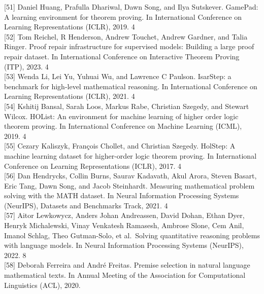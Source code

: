 \documentclass[
]{article}
\begin{document}
{[}51{]} Daniel Huang, Prafulla Dhariwal, Dawn Song, and Ilya Sutskever.
GamePad: A learning environment for theorem proving. In International
Conference on Learning Representations (ICLR), 2019. 4\\
{[}52{]} Tom Reichel, R Henderson, Andrew Touchet, Andrew Gardner, and
Talia Ringer. Proof repair infrastructure for supervised models:
Building a large proof repair dataset. In International Conference on
Interactive Theorem Proving (ITP), 2023. 4\\
{[}53{]} Wenda Li, Lei Yu, Yuhuai Wu, and Lawrence C Paulson. IsarStep:
a benchmark for high-level mathematical reasoning. In International
Conference on Learning Representations (ICLR), 2021. 4\\
{[}54{]} Kshitij Bansal, Sarah Loos, Markus Rabe, Christian Szegedy, and
Stewart Wilcox. HOList: An environment for machine learning of higher
order logic theorem proving. In International Conference on Machine
Learning (ICML), 2019. 4\\
{[}55{]} Cezary Kaliszyk, François Chollet, and Christian Szegedy.
HolStep: A machine learning dataset for higher-order logic theorem
proving. In International Conference on Learning Representations (ICLR),
2017. 4\\
{[}56{]} Dan Hendrycks, Collin Burns, Saurav Kadavath, Akul Arora,
Steven Basart, Eric Tang, Dawn Song, and Jacob Steinhardt. Measuring
mathematical problem solving with the MATH dataset. In Neural
Information Processing Systems (NeurIPS), Datasets and Benchmarks Track,
2021. 4\\
{[}57{]} Aitor Lewkowycz, Anders Johan Andreassen, David Dohan, Ethan
Dyer, Henryk Michalewski, Vinay Venkatesh Ramasesh, Ambrose Slone, Cem
Anil, Imanol Schlag, Theo Gutman-Solo, et al.~Solving quantitative
reasoning problems with language models. In Neural Information
Processing Systems (NeurIPS), 2022. 8\\
{[}58{]} Deborah Ferreira and André Freitas. Premise selection in
natural language mathematical texts. In Annual Meeting of the
Association for Computational Linguistics (ACL), 2020.
\end{document}
